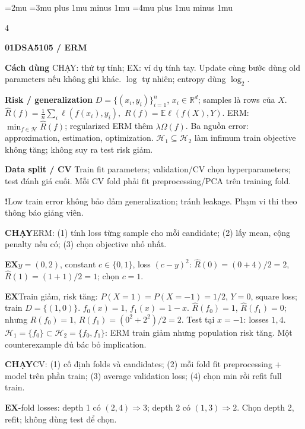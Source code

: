 \documentclass[a4paper]{article}
\newcommand{\bodystyle}{%
  \fontsize{5.4}{5.75}\selectfont\RaggedRight
  \setlength{\lineskip}{.25pt}%
  \thinmuskip=2mu
  \medmuskip=3mu plus 1mu minus 1mu
  \thickmuskip=4mu plus 1mu minus 1mu
  \setlength{\abovedisplayskip}{2pt}\setlength{\belowdisplayskip}{2pt}%
  \setlength{\abovedisplayshortskip}{1pt}\setlength{\belowdisplayshortskip}{1pt}}
\newcommand{\topic}[2]{\par\addvspace{.8pt}%
  \begingroup\setlength{\fboxsep}{0.5pt}%
  \noindent\colorbox{structure}{\parbox{\dimexpr\linewidth-2\fboxsep\relax}{%
    \color{white}\fontsize{6.5}{7.1}\selectfont\bfseries #1\enspace #2}}%
  \endgroup\par\nobreak\vspace{.3pt}\nobreak}
\newcommand{\run}[1]{\key{CHẠY}#1}
\newcommand{\key}[1]{\par\textcolor{structure}{\textbf{#1}}\enspace}
\newcommand{\note}[4]{\par\begingroup\setlength{\fboxsep}{0.15pt}%
  \noindent\colorbox{#1}{\parbox{\dimexpr\linewidth-2\fboxsep\relax}{%
    \RaggedRight\textcolor{#2}{\textbf{#3}}\enspace #4}}%
  \endgroup\par}
\newcommand{\trap}[1]{\note{warningbg}{warning}{!}{#1}}
\newcommand{\ex}[1]{\note{examplebg}{example}{EX}{#1}}
\newcommand{\R}{\mathbb{R}}
\newcommand{\E}{\mathbb{E}}
\begin{document}
\bodystyle
\begin{multicols*}{4}
\topic{01}{DSA5105 / ERM}
\key{Cách dùng} CHẠY: thứ tự tính; EX: ví dụ tính tay. Update cùng bước dùng old parameters nếu không ghi khác. $\log$ tự nhiên; entropy dùng $\log_2$.
\key{Risk / generalization}
$D=\{(x_i,y_i)\}_{i=1}^n$, $x_i\in\R^d$; samples là rows của $X$.
$\widehat R(f)=\frac1n\sum_i\ell(f(x_i),y_i),$ $ R(f)=\E\ell(f(X),Y).$
ERM: $\min_{f\in\mathcal H}\widehat R(f)$; regularized ERM thêm $\lambda\Omega(f)$. Ba nguồn error: approximation, estimation, optimization. $\mathcal H_1\subseteq\mathcal H_2$ làm infimum train objective không tăng; không suy ra test risk giảm.
\key{Data split / CV}
Train fit parameters; validation/CV chọn hyperparameters; test đánh giá cuối. Mỗi CV fold phải fit preprocessing/PCA trên training fold.
\trap{Low train error không bảo đảm generalization; tránh leakage. Phạm vi thi theo thông báo giảng viên.}
\run{ERM: (1) tính loss từng sample cho mỗi candidate; (2) lấy mean, cộng penalty nếu có; (3) chọn objective nhỏ nhất.}
\ex{$y=(0,2)$, constant $c\in\{0,1\}$, loss $(c-y)^2$: $\widehat R(0)=(0+4)/2=2$, $\widehat R(1)=(1+1)/2=1$; chọn $c=1$.}
\ex{Train giảm, risk tăng: $P(X=1)=P(X=-1)=1/2$, $Y=0$, square loss; train $D=\{(1,0)\}$. $f_0(x)=1$, $f_1(x)=1-x$. $\widehat R(f_0)=1$, $\widehat R(f_1)=0$; nhưng $R(f_0)=1$, $R(f_1)=(0^2+2^2)/2=2$. Test tại $x=-1$: losses $1,4$. $\mathcal H_1=\{f_0\}\subset\mathcal H_2=\{f_0,f_1\}$: ERM train giảm nhưng population risk tăng. Một counterexample đủ bác bỏ implication.}
\run{CV: (1) cố định folds và candidates; (2) mỗi fold fit preprocessing + model trên phần train; (3) average validation loss; (4) chọn min rồi refit full train.}
\ex{2-fold losses: depth 1 có $(2,4)\Rightarrow3$; depth 2 có $(1,3)\Rightarrow2$. Chọn depth 2, refit; không dùng test để chọn.}


\end{multicols*}
\end{document}
